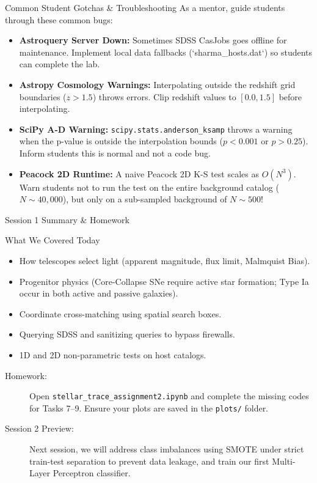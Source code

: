 \documentclass[9pt]{beamer}
\begin{document}
\begin{frame}{Common Student Gotchas \& Troubleshooting}
  As a mentor, guide students through these common bugs:
  \begin{itemize}
    \item \textbf{Astroquery Server Down:}
      Sometimes SDSS CasJobs goes offline for maintenance. Implement local data fallbacks (`sharma\_hosts.dat`) so students can complete the lab.
    \item \textbf{Astropy Cosmology Warnings:}
      Interpolating outside the redshift grid boundaries ($z > 1.5$) throws errors. Clip redshift values to $[0.0, 1.5]$ before interpolating.
    \item \textbf{SciPy A-D Warning:}
      \texttt{scipy.stats.anderson\_ksamp} throws a warning when the p-value is outside the interpolation bounds ($p < 0.001$ or $p > 0.25$). Inform students this is normal and not a code bug.
    \item \textbf{Peacock 2D Runtime:}
      A naive Peacock 2D K-S test scales as $O(N^3)$. Warn students not to run the test on the entire background catalog ($N \sim 40,000$), but only on a sub-sampled background of $N \sim 500$!
  \end{itemize}
\end{frame}

\begin{frame}{Session 1 Summary \& Homework}
  \begin{block}{What We Covered Today}
    \begin{itemize}
      \item How telescopes select light (apparent magnitude, flux limit, Malmquist Bias).
      \item Progenitor physics (Core-Collapse SNe require active star formation; Type Ia occur in both active and passive galaxies).
      \item Coordinate cross-matching using spatial search boxes.
      \item Querying SDSS and sanitizing queries to bypass firewalls.
      \item 1D and 2D non-parametric tests on host catalogs.
    \end{itemize}
  \end{block}
  \begin{description}
    \item[Homework:] Open \texttt{stellar\_trace\_assignment2.ipynb} and complete the missing codes for Tasks 7--9. Ensure your plots are saved in the \texttt{plots/} folder.
    \item[Session 2 Preview:] Next session, we will address class imbalances using SMOTE under strict train-test separation to prevent data leakage, and train our first Multi-Layer Perceptron classifier.
  \end{description}
\end{frame}
\end{document}
